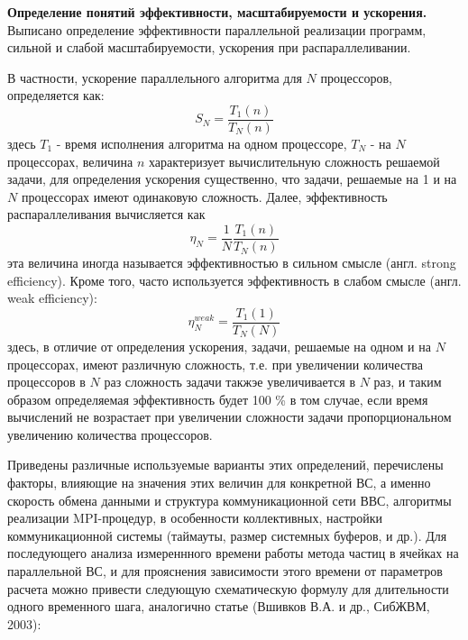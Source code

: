 
\textbf{Определение понятий эффективности, масштабируемости и ускорения.}
Выписано определение эффективности параллельной реализации программ, сильной и слабой масштабируемости, ускорения при распараллеливании.

В частности, ускорение параллельного алгоритма для $N$ процессоров, определяется как:
$$
S_N = \frac{T_1(n)}{T_N(n)}
$$  
здесь $T_1$ - время исполнения алгоритма на одном процессоре, $T_N$ - на $N$ процессорах, величина $n$ характеризует вычислительную сложность решаемой задачи, для определения ускорения существенно, что задачи, решаемые на 1 и на $N$ процессорах имеют одинаковую сложность.
Далее, эффективность распараллеливания вычисляется как
$$
\eta_N = \frac{1}{N}\frac{T_1(n)}{T_N(n)}
$$  
эта величина иногда называется эффективностью в сильном смысле (англ. strong efficiency). Кроме того, часто используется эффективность в слабом смысле (англ. weak efficiency):
\begin{equation}
\label{weak_eff}
\eta^{weak}_N = \frac{T_1(1)}{T_N(N)}
\end{equation}
здесь, в отличие от определения ускорения, задачи, решаемые на одном и на $N$ процессорах, имеют различную сложность, т.е. при увеличении количества процессоров в $N$ раз сложность задачи такжэе увеличивается в $N$ раз, и таким образом определяемая эффективность будет 100 \% в том случае, если время вычислений не возрастает при увеличении сложности задачи пропорциональном увеличению количества процессоров.   

Приведены различные используемые варианты этих определений, перечислены факторы, влияющие на  значения этих величин для конкретной ВС, а именно скорость обмена данными и структура коммуникационной сети ВВС, алгоритмы реализации MPI-процедур, в особенности коллективных, настройки коммуникационной системы (таймауты, размер системных буферов, и др.).
Для последующего анализа измереннного времени работы метода частиц в ячейках на параллельной ВС, и для прояснения зависимости этого времени от параметров расчета можно привести следующую схематическую формулу для длительности одного временного шага, аналогично статье (Вшивков В.А. и др., СибЖВМ, 2003):


